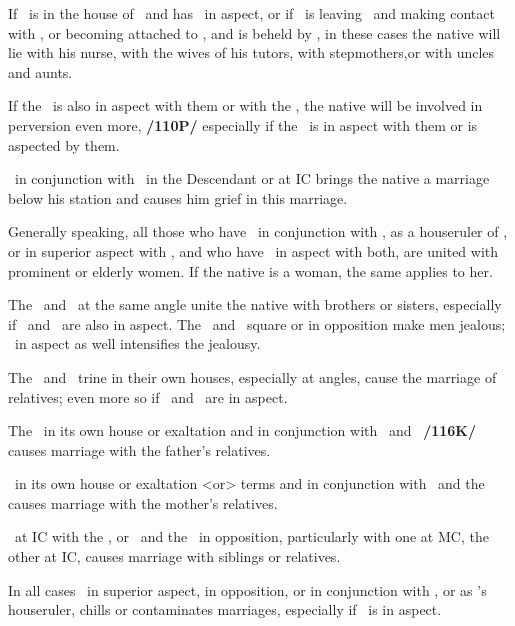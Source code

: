 If \Venus\, is in the house of \Saturn\, and has  \Jupiter\, in aspect, or if \Venus\, is leaving \Jupiter\, and making contact with \Saturn, or becoming attached to \Saturn, and is beheld by \Mars, in these cases the native will lie with his nurse, with the wives of his tutors, with stepmothers,or with uncles and aunts. 

If the \Sun\, is also in aspect with them or with the \Moon, the native will be involved in perversion even more, \textbf{/110P/} especially if the \Moon\, is in aspect with them or is aspected by them. 

\Venus\, in conjunction with \Saturn\, in the Descendant or at IC brings the native a marriage below his station and causes him grief in this marriage. 

Generally speaking, all those who have \Venus\, in conjunction with \Saturn, as a houseruler of \Saturn, or in superior aspect with \Saturn, and who have \Jupiter\, in aspect with both, are united with prominent or elderly women. If the native is a woman, the same applies to her.

The \Moon\, and \Venus\, at the same angle unite the native with brothers or sisters, especially if \Jupiter\,
and \Mars\, are also in aspect. The \Moon\, and \Venus\, square or in opposition make men jealous; \Mars\, in aspect as well intensifies the jealousy. 

The \Moon\, and \Venus\, trine in their own houses, especially at angles, cause the marriage of relatives; even more so if \Mars\, and \Jupiter\, are in aspect. 

The \Sun\, in its own house or exaltation and in conjunction with \Jupiter\, and \Venus\, \textbf{/116K/} causes marriage with the father’s relatives. 

\Venus\, in its own house or exaltation <or> terms and in conjunction with \Mercury\, and the \Moon\, causes marriage with the mother’s relatives. 

\Venus\, at IC with the \Moon, or \Venus\, and the \Moon\, in opposition, particularly with one at MC, the other at IC, causes marriage with siblings or relatives.

In all cases \Saturn\, in superior aspect, in opposition, or in conjunction with \Venus, or as \Venus’s houseruler, chills or contaminates marriages, especially if \Mercury\, is in aspect. 

